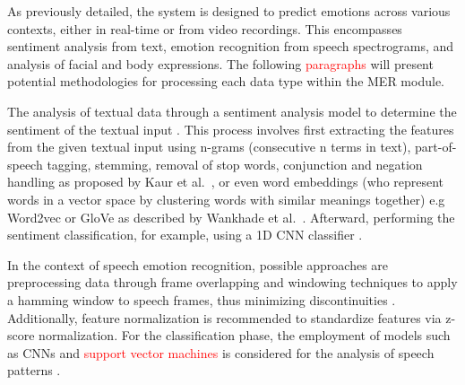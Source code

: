\documentclass[runningheads]{llncs}
\begin{document}
As previously detailed, the system is designed to predict emotions across various contexts, either in real-time or from video recordings. This encompasses sentiment analysis from text, emotion recognition from speech spectrograms, and analysis of facial and body expressions. The following \textcolor{red}{paragraphs} will present potential methodologies for processing each data type within the MER module.

The analysis of textual data through a sentiment analysis model to determine the sentiment of the textual input \cite{hajek_neural_2021}. This process involves first extracting the features from the given textual input using n-grams (consecutive n terms in text), part-of-speech tagging, stemming, removal of stop words, conjunction and negation handling as proposed by Kaur et al.~\cite{kaur_survey_2017}, or even word embeddings (who represent words in a vector space by clustering words with similar meanings together) e.g Word2vec or GloVe as described by Wankhade et al.~\cite{wankhade_survey_2022}. Afterward, performing the sentiment classification, for example, using a 1D CNN classifier \cite{hung_beyond_2023}.

In the context of speech emotion recognition, possible approaches are preprocessing data through frame overlapping and windowing techniques to apply a hamming window to speech frames, thus minimizing discontinuities \cite{Ayadi2011, de_lope_hybrid_2022}. Additionally, feature normalization is recommended to standardize features via z-score normalization. For the classification phase, the employment of models such as CNNs and \textcolor{red}{support vector machines} is considered for the analysis of speech patterns \cite{Badshah2017}.
\end{document}
